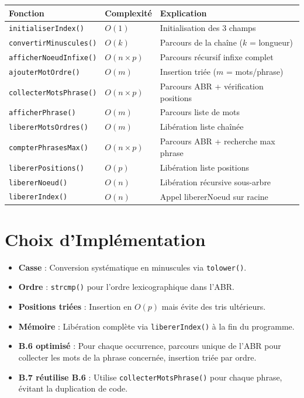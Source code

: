 \documentclass[12pt,a4paper]{article}
\begin{document}
\begin{tabular}{|l|l|p{7cm}|}
\hline
\textbf{Fonction} & \textbf{Complexité} & \textbf{Explication} \\
\hline
\texttt{initialiserIndex()} & $O(1)$ & Initialisation des 3 champs \\
\hline
\texttt{convertirMinuscules()} & $O(k)$ & Parcours de la chaîne ($k$ = longueur) \\
\hline
\texttt{afficherNoeudInfixe()} & $O(n \times p)$ & Parcours récursif infixe complet \\
\hline
\texttt{ajouterMotOrdre()} & $O(m)$ & Insertion triée ($m$ = mots/phrase) \\
\hline
\texttt{collecterMotsPhrase()} & $O(n \times p)$ & Parcours ABR + vérification positions \\
\hline
\texttt{afficherPhrase()} & $O(m)$ & Parcours liste de mots \\
\hline
\texttt{libererMotsOrdres()} & $O(m)$ & Libération liste chaînée \\
\hline
\texttt{compterPhrasesMax()} & $O(n \times p)$ & Parcours ABR + recherche max phrase \\
\hline
\texttt{libererPositions()} & $O(p)$ & Libération liste positions \\
\hline
\texttt{libererNoeud()} & $O(n)$ & Libération récursive sous-arbre \\
\hline
\texttt{libererIndex()} & $O(n)$ & Appel libererNoeud sur racine \\
\hline
\end{tabular}

\section{Choix d'Implémentation}

\begin{itemize}[noitemsep,topsep=0pt]
    \item \textbf{Casse} : Conversion systématique en minuscules via \texttt{tolower()}.
    \item \textbf{Ordre} : \texttt{strcmp()} pour l'ordre lexicographique dans l'ABR.
    \item \textbf{Positions triées} : Insertion en $O(p)$ mais évite des tris ultérieurs.
    \item \textbf{Mémoire} : Libération complète via \texttt{libererIndex()} à la fin du programme.
    \item \textbf{B.6 optimisé} : Pour chaque occurrence, parcours unique de l'ABR pour collecter les mots de la phrase concernée, insertion triée par ordre.
    \item \textbf{B.7 réutilise B.6} : Utilise \texttt{collecterMotsPhrase()} pour chaque phrase, évitant la duplication de code.
\end{itemize}
\end{document}
